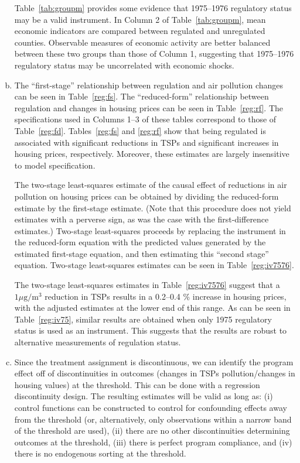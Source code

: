 \documentclass{article}
\begin{document}
\begin{enumerate}[(a)]
Table~\ref{tab:groupm} provides some evidence that 1975--1976 regulatory status may be a valid instrument. In Column 2 of Table~\ref{tab:groupm}, mean economic indicators are compared between regulated and unregulated counties. Observable measures of economic activity are better balanced between these two groups than those of Column 1, suggesting that 1975--1976 regulatory status may be uncorrelated with economic shocks.

\item The ``first-stage'' relationship between regulation and air pollution changes can be seen in Table~\ref{reg:fs}. The ``reduced-form'' relationship between regulation and changes in housing prices can be seen in Table~\ref{reg:rf}. The specifications used in Columns 1--3 of these tables correspond to those of Table~\ref{reg:fd}. Tables~\ref{reg:fs} and \ref{reg:rf} show that being regulated is associated with significant reductions in TSPs and significant increases in housing prices, respectively. Moreover, these estimates are largely insensitive to model specification.





The two-stage least-squares estimate of the causal effect of reductions in air pollution on housing prices can be obtained by dividing the reduced-form estimate by the first-stage estimate. (Note that this procedure does not yield estimates with a perverse sign, as was the case with the first-difference estimates.) Two-stage least-squares proceeds by replacing the instrument in the reduced-form equation with the predicted values generated by the estimated first-stage equation, and then estimating this ``second stage'' equation. Two-stage least-squares estimates can be seen in Table~\ref{reg:iv7576}.



The two-stage least-squares estimates in Table~\ref{reg:iv7576} suggest that a $1 \mu\text{g}/\text{m}^{3}$ reduction in TSPs results in a 0.2--0.4 \% increase in housing prices, with the adjusted estimates at the lower end of this range. As can be seen in Table~\ref{reg:iv75}, similar results are obtained when only 1975 regulatory status is used as an instrument. This suggests that the results are robust to alternative measurements of regulation status.



\item Since the treatment assignment is discontinuous, we can identify the program effect off of discontinuities in outcomes (changes in TSPs pollution/changes in housing values) at the threshold. This can be done with a regression discontinuity design. The resulting estimates will be valid as long as: (i) control functions can be constructed to control for confounding effects away from the threshold (or, alternatively, only observations within a narrow band of the threshold are used), (ii) there are no other discontinuities determining outcomes at the threshold, (iii) there is perfect program compliance, and (iv) there is no endogenous sorting at the threshold.


\end{enumerate}
\end{document}

